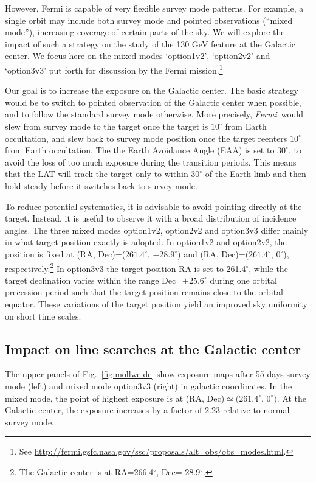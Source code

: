 \documentclass[aps,prd,superscriptaddress,nofootinbib,fixlfloat, 12pt]{revtex4-1}
\newcommand{\Fermi}{{\slshape Fermi}}
\begin{document}
However, Fermi is capable of very flexible survey mode patterns. For example,
a single orbit may include both survey mode and pointed observations (``mixed
mode''), increasing coverage of certain parts of the sky. We will explore the
impact of such a strategy on the study of the 130 GeV feature at the Galactic
center.  We focus here on the mixed modes `option1v2', `option2v2' and
`option3v3' put forth for discussion by the Fermi mission.\footnote{See
\url{http://fermi.gsfc.nasa.gov/ssc/proposals/alt_obs/obs_modes.html}.}

Our goal is to increase the exposure on the Galactic center.  The
basic strategy would be to switch to pointed observation of the Galactic
center when possible, and to follow the standard survey mode otherwise. More
precisely, \Fermi\ would slew from survey mode to the target once the target
is $10^\circ$ from Earth occultation, and slew back to survey mode position
once the target reenters $10^\circ$ from Earth occultation.  The
the Earth Avoidance Angle (EAA) is set to
$30^\circ$, to avoid the loss of too much exposure during the transition
periods. This means that the LAT will track the target only to within $30^\circ$ of
the Earth limb and then hold steady before it switches back to survey mode. 

To reduce potential systematics, it is advisable to avoid pointing directly at
the target. Instead, it is useful to observe it with a broad distribution of
incidence angles. The three mixed modes option1v2, option2v2
and option3v3 differ mainly in what target position exactly is adopted.
In option1v2 and option2v2, the position is fixed at (RA,
Dec)=($261.4^\circ$, $-28.9^\circ$) and (RA, Dec)=($261.4^\circ$, $0^\circ$),
respectively.\footnote{The Galactic center is at RA=266.4$^\circ$,
Dec=-28.9$^\circ$.}  In option3v3 the target position RA is set to
261.4$^\circ$, while the target declination varies within the
range Dec=$\pm25.6^\circ$ during one orbital precession period such that the
target position remains close to the orbital equator.  These variations of the target
position yield an improved sky uniformity on short time scales. 

\subsection{Impact on line searches at the Galactic center}
The upper panels of Fig.~\ref{fig:mollweide} show exposure maps after 55 days
survey mode (left) and mixed mode option3v3 (right) in galactic
coordinates.  In the mixed mode, the point of highest exposure is at (RA,
Dec)$\simeq(261.4^\circ$, $0^\circ)$. At the Galactic center, the exposure increases by a
factor of 2.23 relative to normal survey mode.
\end{document}
